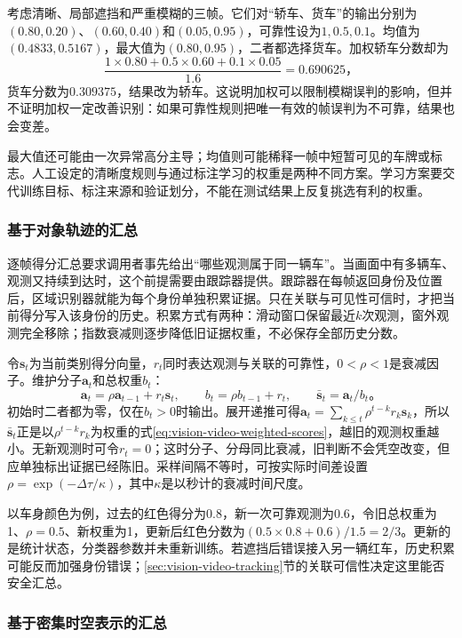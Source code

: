 考虑清晰、局部遮挡和严重模糊的三帧。它们对“轿车、货车”的输出分别为$(0.80,0.20)$、$(0.60,0.40)$和$(0.05,0.95)$，可靠性设为$1,0.5,0.1$。均值为$(0.4833,0.5167)$，最大值为$(0.80,0.95)$，二者都选择货车。加权轿车分数却为
\[
  \frac{1\times0.80+0.5\times0.60+0.1\times0.05}{1.6}
  =0.690625\text{，}
\]
货车分数为$0.309375$，结果改为轿车。这说明加权可以限制模糊误判的影响，但并不证明加权一定改善识别：如果可靠性规则把唯一有效的帧误判为不可靠，结果也会变差。

最大值还可能由一次异常高分主导；均值则可能稀释一帧中短暂可见的车牌或标志。人工设定的清晰度规则与通过标注学习的权重是两种不同方案。学习方案要交代训练目标、标注来源和验证划分，不能在测试结果上反复挑选有利的权重。

\subsubsection{基于对象轨迹的汇总}
\label{sec:vision-video-track-evidence}

逐帧得分汇总要求调用者事先给出“哪些观测属于同一辆车”。当画面中有多辆车、观测又持续到达时，这个前提需要由跟踪器提供。跟踪器在每帧返回身份及位置后，区域识别器就能为每个身份单独积累证据。只在关联与可见性可信时，才把当前得分写入该身份的历史。积累方式有两种：滑动窗口保留最近$k$次观测，窗外观测完全移除；指数衰减则逐步降低旧证据权重，不必保存全部历史分数。

令$\bm{s}_t$为当前类别得分向量，$r_t$同时表达观测与关联的可靠性，$0<\rho<1$是衰减因子。维护分子$\bm{a}_t$和总权重$b_t$：
\begin{equation}
  \bm{a}_t=\rho\bm{a}_{t-1}+r_t\bm{s}_t,\qquad
  b_t=\rho b_{t-1}+r_t,\qquad
  \bar{\bm{s}}_t=\bm{a}_t/b_t\text{。}
  \label{eq:vision-video-decay}
\end{equation}
初始时二者都为零，仅在$b_t>0$时输出。展开递推可得$\bm{a}_t=\sum_{k\leq t}\rho^{t-k}r_k\bm{s}_k$，所以$\bar{\bm{s}}_t$正是以$\rho^{t-k}r_k$为权重的式\eqref{eq:vision-video-weighted-scores}，越旧的观测权重越小。无新观测时可令$r_t=0$；这时分子、分母同比衰减，旧判断不会凭空改变，但应单独标出证据已经陈旧。采样间隔不等时，可按实际时间差设置$\rho=\exp(-\Delta\tau/\kappa)$，其中$\kappa$是以秒计的衰减时间尺度。

以车身颜色为例，过去的红色得分为0.8，新一次可靠观测为0.6，令旧总权重为1、$\rho=0.5$、新权重为1，更新后红色分数为$(0.5\times0.8+0.6)/1.5=2/3$。更新的是统计状态，分类器参数并未重新训练。若遮挡后错误接入另一辆红车，历史积累可能反而加强身份错误；\ref{sec:vision-video-tracking}节的关联可信性决定这里能否安全汇总。

\subsubsection{基于密集时空表示的汇总}
\label{sec:vision-video-dense-state}

